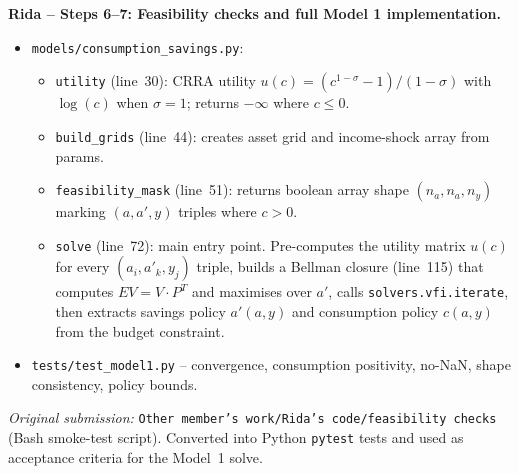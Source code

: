 \documentclass[11pt]{article}
\begin{document}
\begin{intuitbox}
\medskip
\textbf{Rida -- Steps 6--7: Feasibility checks and full Model 1 implementation.}
\begin{itemize}
    \item \texttt{models/consumption\_savings.py}:
    \begin{itemize}
        \item \texttt{utility} (line~30): CRRA utility $u(c)=(c^{1-\sigma}-1)/(1-\sigma)$ with $\log(c)$ when $\sigma=1$; returns $-\infty$ where $c\leq 0$.
        \item \texttt{build\_grids} (line~44): creates asset grid and income-shock array from params.
        \item \texttt{feasibility\_mask} (line~51): returns boolean array shape $(n_a, n_a, n_y)$ marking $(a, a', y)$ triples where $c>0$.
        \item \texttt{solve} (line~72): main entry point. Pre-computes the utility matrix $u(c)$ for every $(a_i, a'_k, y_j)$ triple, builds a Bellman closure (line~115) that computes $EV = V \cdot P^T$ and maximises over $a'$, calls \texttt{solvers.vfi.iterate}, then extracts savings policy $a'(a,y)$ and consumption policy $c(a,y)$ from the budget constraint.
    \end{itemize}
    \item \texttt{tests/test\_model1.py} -- convergence, consumption positivity, no-NaN, shape consistency, policy bounds.
\end{itemize}
\textit{Original submission:} \texttt{Other member's work/Rida's code/feasibility checks} (Bash smoke-test script).
Converted into Python \texttt{pytest} tests and used as acceptance criteria for the Model~1 solve.


\end{intuitbox}
\end{document}
